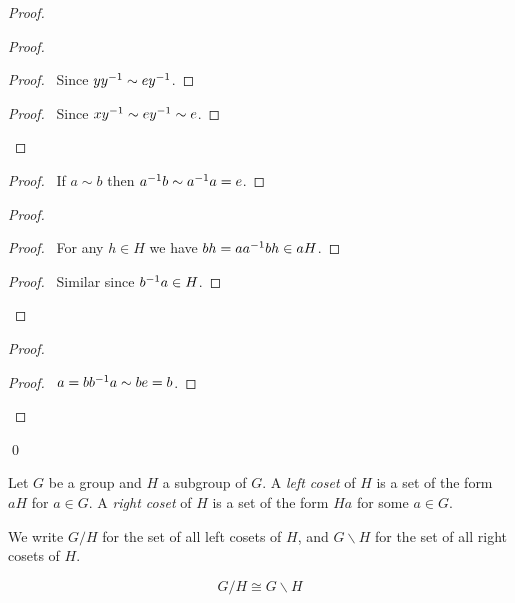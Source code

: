 \begin{proof}
\pf
{}
\begin{proof}
	\begin{proof}
		\pf\ Since $y {y}^{-1} \sim e {y}^{-1}$.
	\end{proof}
	\begin{proof}
		\pf\ Since $x {y}^{-1} \sim e {y}^{-1} \sim e$.
	\end{proof}
\end{proof}
\begin{proof}
	\pf\ If $a \sim b$ then ${a}^{-1} b \sim {a}^{-1} a = e$.
\end{proof}
\begin{proof}
	\begin{proof}
		\pf\ For any $h \in H$ we have $bh = a {a}^{-1} b h \in a H$.	
	\end{proof}
	\begin{proof}
		\pf\ Similar since ${b}^{-1}a \in H$.
	\end{proof}
\end{proof}
\begin{proof}
	\begin{proof}
		\pf\ $a = b {b}^{-1} a \sim b e = b$.
	\end{proof}
\end{proof}
\qed
\end{proof}

\begin{df}[Coset]
Let $G$ be a group and $H$ a subgroup of $G$. A \emph{left coset} of $H$ is a set of the form $aH$ for $a \in G$. A \emph{right coset} of $H$ is a set of the form $Ha$ for some $a \in G$.

We write $G / H$ for the set of all left cosets of $H$, and $G \backslash H$ for the set of all right cosets of $H$.
\end{df}

\begin{prop}
\[ G / H \cong G \backslash H \]
\end{prop}

